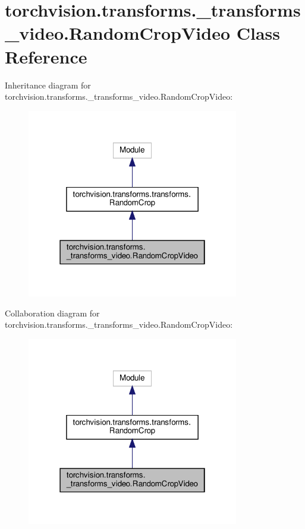 \hypertarget{classtorchvision_1_1transforms_1_1__transforms__video_1_1RandomCropVideo}{}\section{torchvision.\+transforms.\+\_\+transforms\+\_\+video.\+Random\+Crop\+Video Class Reference}
\label{classtorchvision_1_1transforms_1_1__transforms__video_1_1RandomCropVideo}


Inheritance diagram for torchvision.\+transforms.\+\_\+transforms\+\_\+video.\+Random\+Crop\+Video\+:
\nopagebreak
\begin{figure}[H]
\begin{center}
\leavevmode
\includegraphics[width=262pt]{classtorchvision_1_1transforms_1_1__transforms__video_1_1RandomCropVideo__inherit__graph}
\end{center}
\end{figure}


Collaboration diagram for torchvision.\+transforms.\+\_\+transforms\+\_\+video.\+Random\+Crop\+Video\+:
\nopagebreak
\begin{figure}[H]
\begin{center}
\leavevmode
\includegraphics[width=262pt]{classtorchvision_1_1transforms_1_1__transforms__video_1_1RandomCropVideo__coll__graph}
\end{center}
\end{figure}
